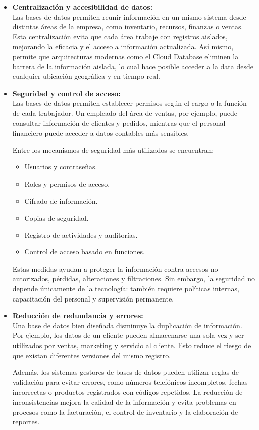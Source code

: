 \documentclass[12pt,a4paper]{article}
\begin{document}
\begin{itemize}
  \item \textbf{Centralización y accesibilidad de datos:} \\
  Las bases de datos permiten reunir información en un mismo sistema desde distintas áreas de la empresa, como inventario, recursos, finanzas o ventas. Esta centralización evita que cada área trabaje con registros aislados, mejorando la eficacia y el acceso a información actualizada. Así mismo, permite que arquitecturas modernas como el Cloud Database eliminen la barrera de la información aislada, lo cual hace posible acceder a la data desde cualquier ubicación geográfica y en tiempo real.

  \item \textbf{Seguridad y control de acceso:} \\
  Las bases de datos permiten establecer permisos según el cargo o la función de cada trabajador. Un empleado del área de ventas, por ejemplo, puede consultar información de clientes y pedidos, mientras que el personal financiero puede acceder a datos contables más sensibles.

  Entre los mecanismos de seguridad más utilizados se encuentran:
  \begin{itemize}
    \item Usuarios y contraseñas.
    \item Roles y permisos de acceso.
    \item Cifrado de información.
    \item Copias de seguridad.
    \item Registro de actividades y auditorías.
    \item Control de acceso basado en funciones.
  \end{itemize}

  Estas medidas ayudan a proteger la información contra accesos no autorizados, pérdidas, alteraciones y filtraciones. Sin embargo, la seguridad no depende únicamente de la tecnología: también requiere políticas internas, capacitación del personal y supervisión permanente.

  \item \textbf{Reducción de redundancia y errores:} \\
  Una base de datos bien diseñada disminuye la duplicación de información. Por ejemplo, los datos de un cliente pueden almacenarse una sola vez y ser utilizados por ventas, marketing y servicio al cliente. Esto reduce el riesgo de que existan diferentes versiones del mismo registro.

  Además, los sistemas gestores de bases de datos pueden utilizar reglas de validación para evitar errores, como números telefónicos incompletos, fechas incorrectas o productos registrados con códigos repetidos. La reducción de inconsistencias mejora la calidad de la información y evita problemas en procesos como la facturación, el control de inventario y la elaboración de reportes.
\end{itemize}
\end{document}
